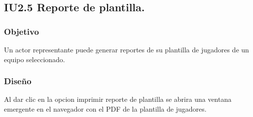 
\subsection{IU2.5 Reporte de plantilla.}

\subsubsection{Objetivo}
	Un actor representante puede generar reportes de su plantilla de jugadores de un equipo seleccionado.

\subsubsection{Diseño}
  Al dar clic en la opcion imprimir reporte de plantilla se abrira una ventana emergente en el navegador con el PDF de la plantilla de jugadores.
